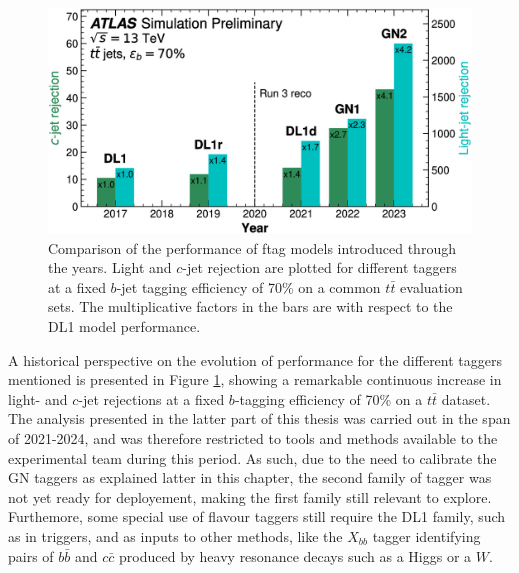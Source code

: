 \begin{figure}[h!]
  \center
  \includegraphics[scale=0.3]{Images/FTAG/storyFtag.png}
  \caption{Comparison of the performance of \gls{ftag} models introduced through the years. Light and $c$-jet rejection are plotted for different taggers at a fixed $b$-jet tagging efficiency of 70\% on a common $t\bar{t}$ evaluation sets. The multiplicative factors in the bars are with respect to the DL1 model performance.} 
  \label{fig:storyFtag}
\end{figure}

A historical perspective on the evolution of performance for the different taggers mentioned is presented in Figure \ref{fig:storyFtag}, showing a remarkable continuous increase in light- and $c$-jet rejections at a fixed $b$-tagging efficiency of 70\% on a $t\bar{t}$ dataset. The analysis presented in the latter part of this thesis was carried out in the span of 2021-2024, and was therefore restricted to tools and methods available to the experimental team during this period. As such, due to the need to calibrate the GN taggers as explained latter in this chapter, the second family of tagger was not yet ready for deployement, making the first family still relevant to explore. Furthemore, some special use of flavour taggers still require the DL1 family, such as in triggers, and as inputs to other methods, like the $X_{bb}$ tagger identifying pairs of $b\bar{b}$ and $c\bar{c}$ produced by heavy resonance decays such as a Higgs or a $W$. 

